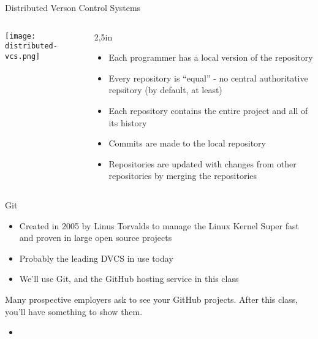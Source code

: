 \documentclass{beamer}
\begin{document}
\begin{frame}[fragile]{Distributed Verson Control Systems}

\begin{columns}[t]
\begin{column}{2.25in}
\begin{center}
\texttt{[image: distributed-vcs.png]}
\end{center}
\end{column}
\begin{column}{2,5in}
\begin{itemize}
\item Each programmer has a local version of the repository
\item Every repository is ``equal'' - no central authoritative repsitory (by default, at least)
\item Each repository contains the entire project and all of its history
\item Commits are made to the local repository
\item Repositories are updated with changes from other repositories by merging the repositories
\end{itemize}
\end{column}
\end{columns}

\end{frame}

\begin{frame}[fragile]{Git}

\begin{itemize}
\item Created in 2005 by Linus Torvalds to manage the Linux Kernel Super fast and proven in large open source projects
\item Probably the leading DVCS in use today
\item We'll use Git, and the GitHub hosting service in this class
\end{itemize}

Many prospective employers ask to see your GitHub projects. After this class, you'll have something to show them.

\begin{itemize}
\item
\end{itemize}


\end{frame}
\end{document}
